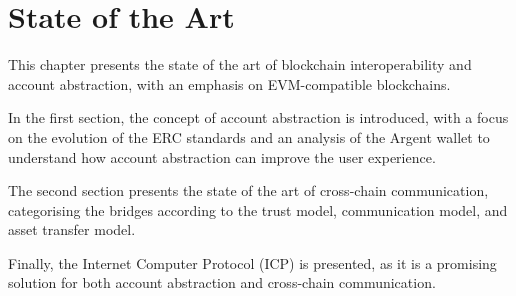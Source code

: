 \chapter{State of the Art}
\label{chap:state_of_the_art}

This chapter presents the state of the art of blockchain interoperability and account abstraction, with an emphasis on EVM-compatible blockchains.\cite{evm} 

In the first section, the concept of account abstraction is introduced, with a focus on the evolution of the ERC standards and an analysis of the Argent wallet to understand how account abstraction can improve the user experience.

The second section presents the state of the art of cross-chain communication, categorising the bridges according to the trust model, communication model, and asset transfer model. 

Finally, the Internet Computer Protocol (ICP) is presented, as it is a promising solution for both account abstraction and cross-chain communication. 





